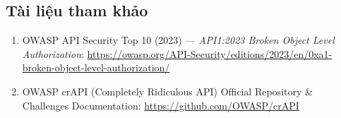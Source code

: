 \documentclass[11pt, a4paper]{article}
\begin{document}
\subsection{Tài liệu tham khảo}

\begin{enumerate}
    \item OWASP API Security Top 10 (2023) --- \textit{API1:2023 Broken Object Level Authorization}: \url{https://owasp.org/API-Security/editions/2023/en/0xa1-broken-object-level-authorization/}
    \item OWASP crAPI (Completely Ridiculous API) Official Repository \& Challenges Documentation: \url{https://github.com/OWASP/crAPI}
\end{enumerate}
\end{document}
